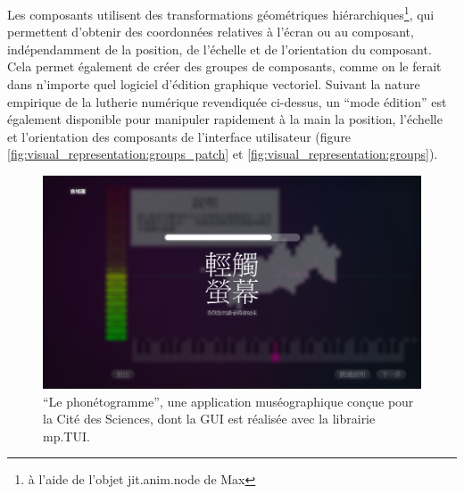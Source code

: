 \noindent Les composants utilisent des transformations géométriques hiérarchiques\footnote{à l'aide de l'objet jit.anim.node de Max}, qui permettent d'obtenir des coordonnées relatives à l'écran ou au composant, indépendamment de la position, de l'échelle et de l'orientation du composant. Cela permet également de créer des groupes de composants, comme on le ferait dans n'importe quel logiciel d'édition graphique vectoriel. Suivant la nature empirique de la lutherie numérique revendiquée ci-dessus, un ``mode édition'' est également disponible pour manipuler rapidement à la main la position, l'échelle et l'orientation des composants de l'interface utilisateur (figure \ref{fig:visual_representation:groups_patch} et \ref{fig:visual_representation:groups}).

\begin{figure}[!htbp]
	\captionsetup{format=plain}%
	\includegraphics[width=\textwidth]{gfx/06_visual_representation/Phonetogramme.png}
	\caption[``Le phonétogramme'', une application réalisée à l'aide de la librairie mp.TUI]{``Le phonétogramme'', une application muséographique conçue pour la Cité des Sciences, dont la GUI est réalisée avec la librairie mp.TUI.}
	\label{fig:visual_representation:phonetogramme}
\end{figure}

